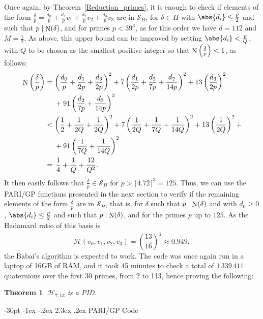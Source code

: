 \documentclass[10pt]{article}
\makeatletter
\renewcommand\section{\@startsection {section}{1}{\z@} {-30pt \@plus
    -1ex \@minus -.2ex} {2.3ex \@plus.2ex}
  {\normalfont\normalsize\bfseries\boldmath}}
\newtheorem{theorem}{Theorem}
\theoremstyle{definition}
\newcommand\hh{\mathcal{H}}
\newcommand\SC{\mathcal{S}}
\newcommand\N{\mathop{\rm N}\nolimits}
\makeatother
\begin{document}
Once again, by Theorem~\ref{Reduction_primes}, it is enough to check
if elements of the form
$\frac{\delta}{p}= \frac{d_0}{p} + \frac{d_1}{p} v_1 + \frac{d_2}{p}
v_2 + \frac{d_3}{p} v_3$ are in $ \SC_H$, for $\delta \in H$ with
$\abs{d_i} \leq \frac{p}{2}$ and such that $p \mid \N(\delta)$, and
for primes $p <39^3$, as for this order we have $d=112$ and
$M=\frac{1}{2}$. As above, this upper bound can be improved by setting
$\abs{d_i} < \frac{p}Q$, with $Q$ to be chosen as the smallest
positive integer so that $\N \left(\frac{\delta}{p} \right) <1$, as
follows:
%
\begin{alignat*}{3}
  \N \left(\frac{\delta}{p} \right) & = \left( \frac{d_0}{p} +
    \frac{d_1}{2p} + \frac{d_3}{2p}\right)^2 + 7 \left( \frac{d_1}{2p}
    + \frac{d_2}{7p} + \frac{d_2}{14p} \right)^2 + 13
  \left( \frac{d_3}{2p} \right)^2 \\
  & \quad \ + 91\left(  \frac{d_2}{7p} + \frac{d_3}{14p} \right)^2 \\\
  & < \left( \frac{1}{2} + \frac{1}{2Q} + \frac{1}{2Q}\right)^2 + 7
  \left( \frac{1}{2Q} + \frac{1}{7Q} + \frac{1}{14Q} \right)^2 + 13
  \left( \frac{1}{2Q} \right)^2 + \\
  & \quad \ + 91\left(  \frac{1}{7Q} + \frac{1}{14Q} \right)^2 \\
  & = \, \frac{1}{4} + \frac{1}{Q} + \frac{12}{Q^2}.
\end{alignat*}
%
It then easily follows that $\frac{\delta}{p} \in \SC_H$ for
$p > \lceil 4.72 \rceil^3 = 125$. Thus, we can use the PARI/GP
functions presented in the next section to verify if the remaining
elements of the form $\frac{\delta}{p}$ are in $\SC_H$, that is, for
$\delta$ such that $p \mid \N(\delta)$ and with $d_0\geq 0$,
$\abs{d_i} \leq \frac{p}{2}$ and such that $p \mid \N(\delta)$, and
for the primes $p$ up to $125$. As the Hadamard ratio of this basis is
\[\hh(v_0,v_1,v_2,v_3)= \left(\frac{13}{16} \right)^{\frac{1}{4}}
\approx 0.949,\] the Babai's algorithm is expected to work.  The
code was once again run in a laptop of 16GB of RAM, and it took 45
minutes to check a total of $1\,339\,411$ quaternions over the first
30 primes, from 2 to 113, hence proving the following:

\begin{theorem}
  $\hh_{7,13}$ is a PID.
\end{theorem}

\section{PARI/GP Code}\label{sec:PARI}
\end{document}
